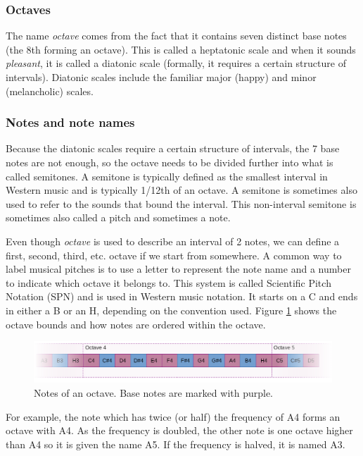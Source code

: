 \subsubsection{Octaves}
The name \textit{octave} comes from the fact that it contains seven distinct base notes (the 8th forming an octave). This is called a heptatonic scale and when it sounds \textit{pleasant}, it is called a diatonic scale (formally, it requires a certain structure of intervals). Diatonic scales include the familiar major (happy) and minor (melancholic) scales. 

\subsubsection{Notes and note names}
Because the diatonic scales require a certain structure of intervals, the 7 base notes are not enough, so the octave needs to be divided further into what is called semitones. A semitone is typically defined as the smallest interval in Western music and is typically 1/12th of an octave. A semitone is sometimes also used to refer to the sounds that bound the interval. This non-interval semitone is sometimes also called a pitch and sometimes a note.

Even though \textit{octave} is used to describe an interval of 2 notes, we can define a first, second, third, etc. octave if we start from somewhere. A common way to label musical pitches is to use a letter to represent the note name and a number to indicate which octave it belongs to. This system is called Scientific Pitch Notation (SPN) and is used in Western music notation. It starts on a C and ends in either a B or an H, depending on the convention used. Figure \ref{fig:noteScale} shows the octave bounds and how notes are ordered within the octave.

\begin{figure}[ht]
    \centering
    \includegraphics[width=\textwidth]{./images/noteScale.png}
    \caption{Notes of an octave. Base notes are marked with purple. \label{fig:noteScale}}
\end{figure}

For example, the note which has twice (or half) the frequency of A4 forms an octave with A4. As the frequency is doubled, the other note is one octave higher than A4 so it is given the name A5. If the frequency is halved, it is named A3. 

